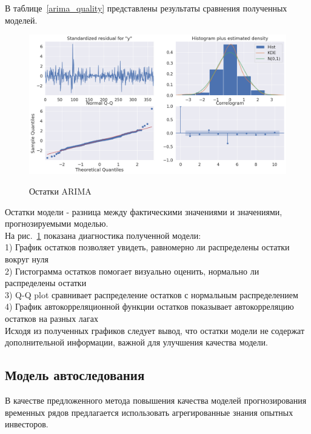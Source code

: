 В таблице~\ref{arima_quality} представлены результаты сравнения полученных моделей.

\newpage 

\begin{figure}[H]\center
{\includegraphics[width=1.0\textwidth]{results/residuals.png}}
\caption{Остатки ARIMA}
\label{residuals}
\end{figure}

Остатки модели - разница между фактическими значениями и значениями, прогнозируемыми моделью. \\

На рис.~\ref{residuals} показана диагностика полученной модели: \\
1) График остатков позволяет увидеть, равномерно ли распределены остатки вокруг нуля \\ 
2) Гистограмма остатков помогает визуально оценить, нормально ли распределены остатки \\
3) Q-Q plot сравнивает распределение остатков с нормальным распределением\\
4) График автокорреляционной функции остатков показывает автокорреляцию остатков на разных лагах \\

Исходя из полученных графиков следует вывод, что остатки модели не содержат дополнительной информации, важной для улучшения качества модели.

\newpage
\subsection{Модель автоследования} 

В качестве предложенного метода повышения качества моделей прогнозирования временных рядов предлагается использовать агрегированные знания опытных инвесторов.

